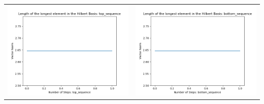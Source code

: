 \documentclass[10pt]{article}
\begin{document}
\begin{tabular}{c|c}
\begin{minipage}{.4\textwidth}
\includegraphics[width=\textwidth]{"DATA/5d/6 generators 1 bound B/top_sequence LENGTH"}
\end{minipage} &
\begin{minipage}{.4\textwidth}
\includegraphics[width=\textwidth]{"DATA/5d/6 generators 1 bound B bottomup/bottom_sequence LENGTH"}
\end{minipage}
\end{tabular}
\end{document}
